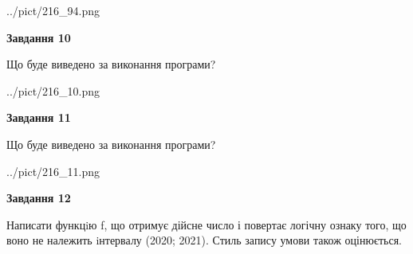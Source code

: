 \documentclass[12pt, ukrainian]{article}
\begin{document}
{\begin {large}
\begin{center}
	{../pict/216_94.png}
\end{center}
\newpage

{\begin {center}\textbf{Завдання 10}\end {center}}

Що буде виведено за виконання програми?\par
\begin{center}
	{../pict/216_10.png}
\end{center}
\newpage

{\begin {center}\textbf{Завдання 11}\end {center}}

Що буде виведено за виконання програми?\par
\begin{center}
	{../pict/216_11.png}
\end{center}
\newpage

{\begin {center}\textbf{Завдання 12}\end {center}}


Написати функцiю f, що отримує дійсне число і повертає логічну ознаку того, що воно не належить iнтервалу (2020; 2021). Стиль запису умови також оцінюється.\par
\newpage

\end {large}}
\end{document}
